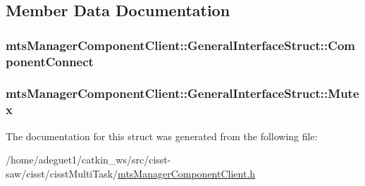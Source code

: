 \subsection{Member Data Documentation}
\hypertarget{structmts_manager_component_client_1_1_general_interface_struct_ac3601e8c80ad2c325e9de360c7d12c7d}{
\subsubsection[{Component\-Connect}]{ mts\-Manager\-Component\-Client\-::\-General\-Interface\-Struct\-::\-Component\-Connect}}\label{structmts_manager_component_client_1_1_general_interface_struct_ac3601e8c80ad2c325e9de360c7d12c7d}
\hypertarget{structmts_manager_component_client_1_1_general_interface_struct_a4a55011d39513a9c87772939b0a23aad}{
\subsubsection[{Mutex}]{ mts\-Manager\-Component\-Client\-::\-General\-Interface\-Struct\-::\-Mutex}}\label{structmts_manager_component_client_1_1_general_interface_struct_a4a55011d39513a9c87772939b0a23aad}


The documentation for this struct was generated from the following file\-:\begin{DoxyCompactItemize}
\item 
/home/adeguet1/catkin\-\_\-ws/src/cisst-\/saw/cisst/cisst\-Multi\-Task/\hyperlink{mts_manager_component_client_8h}{mts\-Manager\-Component\-Client.\-h}\end{DoxyCompactItemize}
